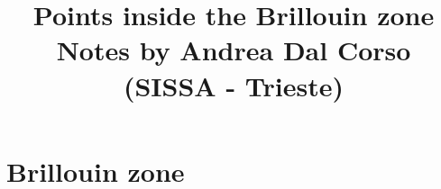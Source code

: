 \documentclass[12pt,a4paper]{article}
\def\qeImage{../../Doc/quantum_espresso.pdf}
\def\democritosImage{../../Doc/democritos.pdf}
\begin{document}
 
\author{}
\date{}
\title{
  \vskip 1cm
  \Huge Points inside the Brillouin zone \\
  \Large Notes by Andrea Dal Corso (SISSA - Trieste)
}
\maketitle

\newpage

\section{Brillouin zone}
\end{document}

